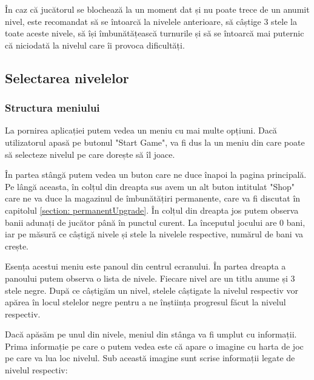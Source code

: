\documentclass[12pt, a4paper]{article}
\begin{document}
	În caz că jucătorul se blochează la un moment dat și nu poate trece de un anumit nivel, este recomandat să se întoarcă la nivelele anterioare, să câștige 3 stele la toate aceste nivele, să își îmbunătățească turnurile și să se întoarcă mai puternic că niciodată la nivelul care îi provoca dificultăți.
	
	
	
	
	
	\subsection{Selectarea nivelelor}
	\label{section: levelSelection}
	
	\subsubsection{Structura meniului}
	
	La pornirea aplicației putem vedea un meniu cu mai multe opțiuni. Dacă utilizatorul apasă pe butonul "Start Game", va fi dus la un meniu din care poate să selecteze nivelul pe care dorește să îl joace.
	
	În partea stângă putem vedea un buton care ne duce înapoi la pagina principală. Pe lângă aceasta, în colțul din dreapta sus avem un alt buton intitulat "Shop" care ne va duce la magazinul de îmbunătățiri permanente, care va fi discutat în capitolul \ref{section: permanentUpgrade}. În colțul din dreapta jos putem observa banii adunați de jucător până în punctul curent. La începutul jocului are 0 bani, iar pe măsură ce câștigă nivele și stele la nivelele respective, numărul de bani va crește.
	\newline
	
	Esența acestui meniu este panoul din centrul ecranului. În partea dreapta a panoului putem observa o lista de nivele. Fiecare nivel are un titlu anume și 3 stele negre. După ce câștigăm un nivel, stelele câștigate la nivelul respectiv vor apărea în locul stelelor negre pentru a ne înștiința progresul făcut la nivelul respectiv.
	\newline
	
	Dacă apăsăm pe unul din nivele, meniul din stânga va fi umplut cu informații. Prima informație pe care o putem vedea este că apare o imagine cu harta de joc pe care va lua loc nivelul. Sub această imagine sunt scrise informații legate de nivelul respectiv:
	
\end{document}
